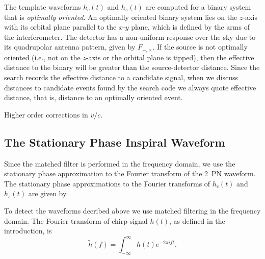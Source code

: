 The template waveforms $h_c(t)$ and $h_s(t)$ are computed for a binary
system that is {\it optimally oriented}. An optimally oriented binary system
lies on the $z$-axis with its orbital plane parallel to the $x$-$y$ plane,
which is defined by the arms of the interferometer. The detector has a
non-uniform response over the sky due to its quadrupolar antenna pattern,
given by $F_{+,\times}$. If the source is not optimally oriented (i.e., not on the
$z$-axis or the orbital plane is tipped), then the effective distance to the
binary will be greater than the source-detector distance. Since the search
records the effective distance to a candidate signal, when we discuss
distances to candidate events found by the search code we always quote
effective distance, that is, distance to an optimally oriented event.

Higher order corrections in $v/c$.

\subsection{The Stationary Phase Inspiral Waveform}

Since the matched filter is performed in the frequency domain, we use the
stationary phase approximation to the Fourier transform of the 2~PN
waveform\cite{poissonwill}. The stationary phase approximations to the Fourier
transforms of $h_c(t)$ and $h_s(t)$ are given by


To detect the waveforms decribed above we use matched filtering in the
frequency domain. The Fourier transform of chirp signal $h(t)$, as defined in
the introduction, is
\begin{equation}
\tilde{h}(f) = \int_{-\infty}^{\infty} h(t) e^{-2\pi i f t}.
\end{equation}


